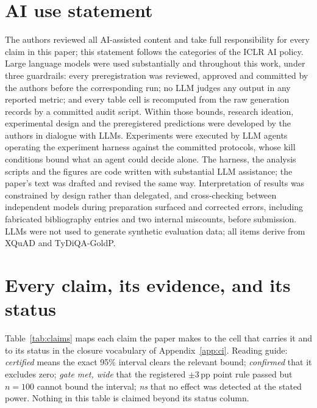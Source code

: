 \documentclass{article}
\begin{document}
\section*{AI use statement}
The authors reviewed all AI-assisted content and take full
responsibility for every claim in this paper; this statement follows
the categories of the ICLR AI policy. Large language models were used
substantially and throughout this work, under three guardrails: every
preregistration was reviewed, approved and committed by the authors
before the corresponding run; no LLM judges any output in any reported
metric; and every table cell is recomputed from the raw generation
records by a committed audit script. Within those bounds, research
ideation, experimental design and the preregistered predictions were
developed by the authors in dialogue with LLMs. Experiments were
executed by LLM agents operating the experiment harness against the
committed protocols, whose kill conditions bound what an agent could
decide alone. The harness, the analysis scripts and the figures are
code written with substantial LLM assistance; the paper's text was
drafted and revised the same way. Interpretation of results was
constrained by design rather than delegated, and cross-checking between
independent models during preparation surfaced and corrected errors,
including fabricated bibliography entries and two internal miscounts,
before submission. LLMs were not used to generate synthetic evaluation
data; all items derive from XQuAD and TyDiQA-GoldP.




\appendix
\section{Every claim, its evidence, and its status}
\label{app:claims}

Table~\ref{tab:claims} maps each claim the paper makes to the cell
that carries it and to its status in the closure vocabulary of
Appendix~\ref{app:ci}. Reading guide: \emph{certified} means the exact
95\% interval clears the relevant bound; \emph{confirmed} that it
excludes zero; \emph{gate met, wide} that the registered $\pm3$\,pp
point rule passed but $n{=}100$ cannot bound the interval; \emph{ns}
that no effect was detected at the stated power. Nothing in this
table is claimed beyond its status column.
\end{document}
